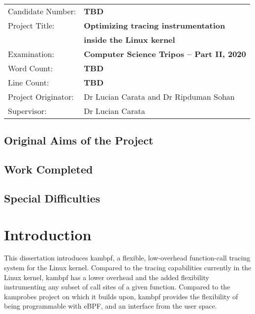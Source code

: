 \documentclass[12pt,twoside,notitlepage]{report}
\begin{document}
{\large
\begin{tabular}{ll}
Candidate Number:   & \bf TBD                   \\
Project Title:      & \bf Optimizing tracing instrumentation \\
                    & \bf inside the Linux kernel \\
Examination:        & \bf Computer Science Tripos -- Part II, 2020      \\
Word Count:         & \bf TBD \\
Line Count:         & \bf TBD \\
Project Originator: & Dr Lucian Carata and Dr Ripduman Sohan     \\
Supervisor:         & Dr Lucian Carata                  \\ 
\end{tabular}
}


\section*{Original Aims of the Project}


\section*{Work Completed}


\section*{Special Difficulties}



\tableofcontents

\listoffigures


\cleardoublepage        %

\setcounter{page}{1}
\pagestyle{headings}

\chapter{Introduction}
    This dissertation introduces kambpf, a flexible, low-overhead function-call tracing system for the Linux kernel. Compared to the tracing capabilities currently in the Linux kernel, kambpf has a lower overhead and the added flexibility instrumenting any subset of call sites of a given function. Compared to the kamprobes project on which it builds upon, kambpf provides the flexibility of being programmable with eBPF, and an interface from the user space. 
\end{document}
